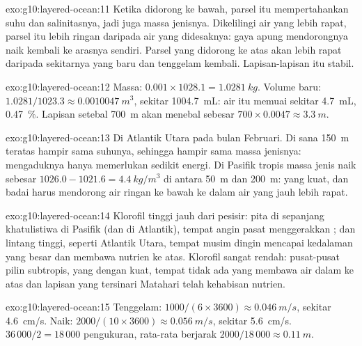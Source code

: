 \begin{solution}{exo:g10:layered-ocean:11}
Ketika didorong ke bawah, parsel itu mempertahankan suhu dan salinitasnya,
jadi juga massa jenisnya. Dikelilingi air yang lebih rapat, parsel itu lebih
ringan daripada air yang didesaknya: gaya apung mendorongnya naik kembali ke
arasnya sendiri. Parsel yang didorong ke atas akan lebih rapat daripada
sekitarnya yang baru dan tenggelam kembali. Lapisan-lapisan itu stabil.
\end{solution}

\begin{solution}{exo:g10:layered-ocean:12}
Massa: $0.001 \times 1028.1 = \qty{1.0281}{kg}$. Volume baru: $1.0281/1023.3
\approx \qty{0.0010047}{m^3}$, sekitar \qty{1004.7}{mL}: air itu memuai
sekitar \qty{4.7}{mL}, \qty{0.47}{\percent}. Lapisan setebal \qty{700}{m} akan
menebal sebesar $700 \times 0.0047 \approx \qty{3.3}{m}$.
\end{solution}

\begin{solution}{exo:g10:layered-ocean:13}
Di Atlantik Utara pada bulan Februari. Di sana \qty{150}{m} teratas hampir
sama suhunya, sehingga hampir sama massa jenisnya: mengaduknya hanya
memerlukan sedikit energi. Di Pasifik tropis massa jenis naik sebesar
$1026.0 - 1021.6 =
\qty{4.4}{kg/m^3}$ di antara \qty{50}{m} dan \qty{200}{m}:  yang
kuat, dan badai harus mendorong air ringan ke bawah ke dalam air yang jauh
lebih rapat.
\end{solution}

\begin{solution}{exo:g10:layered-ocean:14}
Klorofil tinggi jauh dari pesisir: pita di sepanjang khatulistiwa di Pasifik
(dan di Atlantik), tempat angin pasat menggerakkan ; dan
lintang tinggi, seperti Atlantik Utara, tempat  musim dingin
mencapai kedalaman yang besar dan membawa nutrien ke atas. Klorofil sangat
rendah: pusat-pusat pilin subtropis, yang  dengan kuat, tempat
tidak ada yang membawa air dalam ke atas dan lapisan yang tersinari Matahari
telah kehabisan nutrien.
\end{solution}

\begin{solution}{exo:g10:layered-ocean:15}
Tenggelam: $1000/(6 \times 3600) \approx \qty{0.046}{m/s}$, sekitar
\qty{4.6}{cm/s}. Naik: $2000/(10 \times 3600) \approx \qty{0.056}{m/s}$,
sekitar \qty{5.6}{cm/s}. $36\,000/2 = 18\,000$ pengukuran, rata-rata berjarak
$2000/18\,000 \approx \qty{0.11}{m}$.
\end{solution}

